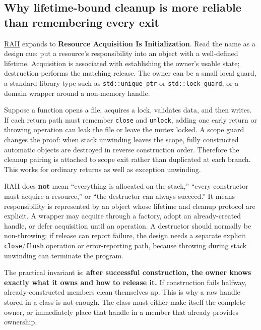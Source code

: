 \subsection{Why lifetime-bound cleanup is more reliable than remembering every exit}\label{05-engine-i-ch004-why-lifetime-bound-cleanup-is-more-reliable-than-remembering-every-exit}

\hyperref[appendix-69739d3ab49b]{RAII} expands to \textbf{Resource Acquisition Is Initialization}. Read the name as a design cue: put a resource's responsibility into an object with a well-defined lifetime. Acquisition is associated with establishing the owner's usable state; destruction performs the matching release. The owner can be a small local guard, a standard-library type such as \texttt{std::unique\_ptr} or \texttt{std::lock\_guard}, or a domain wrapper around a non-memory handle.

Suppose a function opens a file, acquires a lock, validates data, and then writes. If each return path must remember \texttt{close} and \texttt{unlock}, adding one early return or throwing operation can leak the file or leave the mutex locked. A scope guard changes the proof: when stack unwinding leaves the scope, fully constructed automatic objects are destroyed in reverse construction order. Therefore the cleanup pairing is attached to scope exit rather than duplicated at each branch. This works for ordinary returns as well as exception unwinding.

RAII does \textbf{not} mean ``everything is allocated on the stack,'' ``every constructor must acquire a resource,'' or ``the destructor can always succeed.'' It means responsibility is represented by an object whose lifetime and cleanup protocol are explicit. A wrapper may acquire through a factory, adopt an already-created handle, or defer acquisition until an operation. A destructor should normally be non-throwing; if release can report failure, the design needs a separate explicit \texttt{close}/\texttt{flush} operation or error-reporting path, because throwing during stack unwinding can terminate the program.

The practical invariant is: \textbf{after successful construction, the owner knows exactly what it owns and how to release it.} If construction fails halfway, already-constructed members clean themselves up. This is why a raw handle stored in a class is not enough. The class must either make itself the complete owner, or immediately place that handle in a member that already provides ownership.

